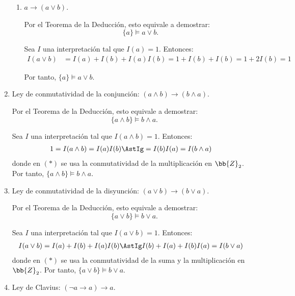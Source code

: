 \begin{ejercicio}
\begin{enumerate}
\begin{enumerate}
            \item $a \rightarrow (a\lor b)$.
            
            Por el Teorema de la Deducción, esto equivale a demostrar:
            \begin{equation*}
                \{a\} \vDash a\lor b.
            \end{equation*}

            Sea $I$ una interpretación tal que $I(a) = 1$. Entonces:
            \begin{align*}
                I(a\lor b) &= I(a) + I(b) + I(a)I(b) = 1 + I(b) + I(b) = 1 + 2I(b) = 1
            \end{align*}

            Por tanto, $\{a\} \vDash a\lor b$.
        \end{enumerate}
        
        \item Ley de conmutatividad de la conjunción: $(a\land b) \rightarrow (b\land a)$.
        
        Por el Teorema de la Deducción, esto equivale a demostrar:
        \begin{equation*}
            \{a\land b\} \vDash b\land a.
        \end{equation*}

        Sea $I$ una interpretación tal que $I(a\land b) = 1$. Entonces:
        \begin{align*}
            1=I(a\land b) &= I(a)I(b)\AstIg = I(b)I(a)=I(b\land a)
        \end{align*}
        donde en $(\ast)$ se usa la conmutatividad de la multiplicación en $\bb{Z}_2$. Por tanto, $\{a\land b\} \vDash b\land a$.
        \item Ley de conmutatividad de la disyunción: $(a\lor b) \rightarrow (b\lor a)$.
        
        Por el Teorema de la Deducción, esto equivale a demostrar:
        \begin{equation*}
            \{a\lor b\} \vDash b\lor a.
        \end{equation*}

        Sea $I$ una interpretación tal que $I(a\lor b) = 1$. Entonces:
        \begin{align*}
            I(a\lor b) &= I(a) + I(b) + I(a)I(b) \AstIg I(b) + I(a) + I(b)I(a) = I(b\lor a)
        \end{align*}
        donde en $(\ast)$ se usa la conmutatividad de la suma y la multiplicación en $\bb{Z}_2$. Por tanto, $\{a\lor b\} \vDash b\lor a$.
        \item Ley de Clavius: $(\neg a \rightarrow a) \rightarrow a$.
        

\end{enumerate}
\end{ejercicio}
